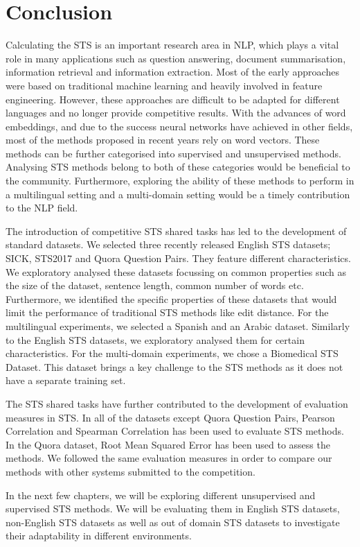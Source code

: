 \section{Conclusion}
Calculating the STS is an important research area in NLP, which plays a vital role in many applications such as question answering, document summarisation, information retrieval and information extraction. Most of the early approaches were based on traditional machine learning and heavily involved in feature engineering. However, these approaches are difficult to be adapted for different languages and no longer provide competitive results. With the advances of word embeddings, and due to the success neural networks have achieved in other fields, most of the methods proposed in recent years rely on word vectors. These methods can be further categorised into supervised and unsupervised methods. Analysing STS methods belong to both of these categories would be beneficial to the community. Furthermore, exploring the ability of these methods to perform in a multilingual setting and a multi-domain setting would be a timely contribution to the NLP field. 

The introduction of competitive STS shared tasks has led to the development of standard datasets. We selected three recently released English STS datasets; SICK, STS2017 and Quora Question Pairs. They feature different characteristics. We exploratory analysed these datasets focussing on common properties such as the size of the dataset, sentence length, common number of words etc. Furthermore, we identified the specific properties of these datasets that would limit the performance of traditional STS methods like edit distance. For the multilingual experiments, we selected a Spanish and an Arabic dataset. Similarly to the English STS datasets, we exploratory analysed them for certain characteristics. For the multi-domain experiments, we chose a Biomedical STS Dataset. This dataset brings a key challenge to the STS methods as it does not have a separate training set. 

The STS shared tasks have further contributed to the development of evaluation measures in STS. In all of the datasets except Quora Question Pairs, Pearson Correlation and Spearman Correlation has been used to evaluate STS methods. In the Quora dataset, Root Mean Squared Error has been used to assess the methods. We followed the same evaluation measures in order to compare our methods with other systems submitted to the competition. 

In the next few chapters, we will be exploring different unsupervised and supervised STS methods. We will be evaluating them in English STS datasets, non-English STS datasets as well as out of domain STS datasets to investigate their adaptability in different environments.

   


